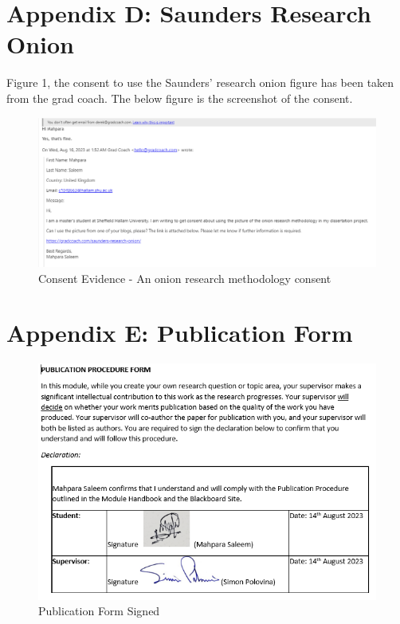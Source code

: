 \documentclass{article}
\begin{document}
\newpage

\section{Appendix D: Saunders Research Onion}
Figure 1, the consent to use the Saunders' research onion figure has been taken from the grad coach. The below figure is the screenshot of the consent.

\begin{figure}[ht!]
    \centering
    \includegraphics[scale=0.3]{onion-ring-consent}
    \caption{Consent Evidence  - 
An onion research methodology consent }
    \label{fig:onion-research-consent}
\end{figure}

\newpage

\section{Appendix E: Publication Form}

\begin{figure}[ht!]
    \centering
    \includegraphics[scale=0.8]{publication-form-signed}
    \caption{Publication Form Signed }
    \label{fig:publication-form-signed}
\end{figure}
\end{document}
